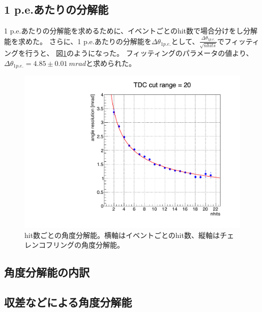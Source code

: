 \documentclass[uplatex, titlepage, dvipdfmx, 12pt, a4paper]{jsreport}
\begin{document}
    \subsection{1 p.e.あたりの分解能}
    1 p.e.あたりの分解能を求めるために、イベントごとのhit数で場合分けをし分解能を求めた。
    さらに、1 p.e.あたりの分解能を$\Delta \theta_{1 p.e.}$として、$\frac{\Delta \theta_{1 p.e.}}{\sqrt{nhits}}$でフィッティングを行うと、
    図\ref{fig:per_hit}のようになった。
    フィッティングのパラメータの値より、$\Delta \theta_{1 p.e.} = 4.85 \pm 0.01 \: \si{mrad}$と求められた。
    \begin{figure}[htbp]
      \begin{center} 
        \includegraphics[scale=0.3, clip]{image/per_hit.pdf}
        \caption{hit数ごとの角度分解能。横軸はイベントごとのhit数、縦軸はチェレンコフリングの角度分解能。} 
        \label{fig:per_hit} 
      \end{center}
    \end{figure}
    
    
    
    \subsection{角度分解能の内訳}
    
    \subsection{収差などによる角度分解能}
    
\end{document}
